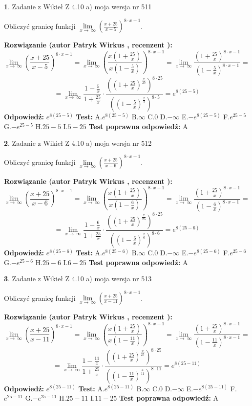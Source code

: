 \documentclass[12pt, a4paper]{article}
\theoremstyle{definition} %
\newtheorem{zad}{}
\newcommand{\zadStart}[1]{\begin{zad}#1\newline}
\newcommand{\zadStop}{\end{zad}}
\newcommand{\rozwStart}[2]{\noindent \textbf{Rozwiązanie (autor #1 , recenzent #2): }\newline}
\newcommand{\rozwStop}{\newline}
\newcommand{\odpStart}{\noindent \textbf{Odpowiedź:}\newline}
\newcommand{\odpStop}{\newline}
\newcommand{\testStart}{\noindent \textbf{Test:}\newline}
\newcommand{\testStop}{\newline}
\newcommand{\kluczStart}{\noindent \textbf{Test poprawna odpowiedź:}\newline}
\newcommand{\kluczStop}{\newline}
\begin{document}
\zadStart{Zadanie z Wikieł Z 4.10 a) moja wersja nr 511}


Obliczyć granicę funkcji  $\lim\limits_{x\to\ \infty}(\frac{x+25}{x-5})^{8\cdot x-1}$.
\zadStop
\rozwStart{Patryk Wirkus}{}
$$\lim\limits_{x\to\ \infty}(\frac{x+25}{x-5})^{8\cdot x-1} = \lim\limits_{x\to\ \infty}(\frac{x(1+\frac{25}{x})}{x(1-\frac{5}{x})})^{8\cdot x-1}=\lim\limits_{x\to\ \infty}\frac{(1+\frac{25}{x})^{8\cdot x-1}}{(1-\frac{5}{x})^{8\cdot x-1}}=$$
$$=\lim\limits_{x\to\ \infty}\frac{1-\frac{5}{x}}{1+\frac{25}{x}}\cdot\frac{((1+\frac{25}{x})^{\frac{x}{25}})^{8\cdot25}}{((1-\frac{5}{x})^{\frac{x}{5}})^{8\cdot5}}=e^{8(25-5)}$$
\rozwStop
\odpStart
$e^{8(25-5)}$
\odpStop
\testStart
A.$e^{8(25-5)}$ B.$\infty$ C.$0$ D.$-\infty$ E.$-e^{8(25-5)}$
F.$e^{25-5}$ G.$-e^{25-5}$
H.$25-5$
I.$5-25$
\testStop
\kluczStart
A
\kluczStop



\zadStart{Zadanie z Wikieł Z 4.10 a) moja wersja nr 512}


Obliczyć granicę funkcji  $\lim\limits_{x\to\ \infty}(\frac{x+25}{x-6})^{8\cdot x-1}$.
\zadStop
\rozwStart{Patryk Wirkus}{}
$$\lim\limits_{x\to\ \infty}(\frac{x+25}{x-6})^{8\cdot x-1} = \lim\limits_{x\to\ \infty}(\frac{x(1+\frac{25}{x})}{x(1-\frac{6}{x})})^{8\cdot x-1}=\lim\limits_{x\to\ \infty}\frac{(1+\frac{25}{x})^{8\cdot x-1}}{(1-\frac{6}{x})^{8\cdot x-1}}=$$
$$=\lim\limits_{x\to\ \infty}\frac{1-\frac{6}{x}}{1+\frac{25}{x}}\cdot\frac{((1+\frac{25}{x})^{\frac{x}{25}})^{8\cdot25}}{((1-\frac{6}{x})^{\frac{x}{6}})^{8\cdot6}}=e^{8(25-6)}$$
\rozwStop
\odpStart
$e^{8(25-6)}$
\odpStop
\testStart
A.$e^{8(25-6)}$ B.$\infty$ C.$0$ D.$-\infty$ E.$-e^{8(25-6)}$
F.$e^{25-6}$ G.$-e^{25-6}$
H.$25-6$
I.$6-25$
\testStop
\kluczStart
A
\kluczStop



\zadStart{Zadanie z Wikieł Z 4.10 a) moja wersja nr 513}


Obliczyć granicę funkcji  $\lim\limits_{x\to\ \infty}(\frac{x+25}{x-11})^{8\cdot x-1}$.
\zadStop
\rozwStart{Patryk Wirkus}{}
$$\lim\limits_{x\to\ \infty}(\frac{x+25}{x-11})^{8\cdot x-1} = \lim\limits_{x\to\ \infty}(\frac{x(1+\frac{25}{x})}{x(1-\frac{11}{x})})^{8\cdot x-1}=\lim\limits_{x\to\ \infty}\frac{(1+\frac{25}{x})^{8\cdot x-1}}{(1-\frac{11}{x})^{8\cdot x-1}}=$$
$$=\lim\limits_{x\to\ \infty}\frac{1-\frac{11}{x}}{1+\frac{25}{x}}\cdot\frac{((1+\frac{25}{x})^{\frac{x}{25}})^{8\cdot25}}{((1-\frac{11}{x})^{\frac{x}{11}})^{8\cdot11}}=e^{8(25-11)}$$
\rozwStop
\odpStart
$e^{8(25-11)}$
\odpStop
\testStart
A.$e^{8(25-11)}$ B.$\infty$ C.$0$ D.$-\infty$ E.$-e^{8(25-11)}$
F.$e^{25-11}$ G.$-e^{25-11}$
H.$25-11$
I.$11-25$
\testStop
\kluczStart
A
\kluczStop
\end{document}
